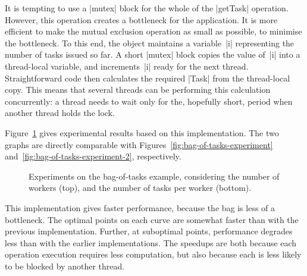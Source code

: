 
It is tempting to use a |mutex| block for the whole of the |getTask|
operation.  However, this operation creates a bottleneck for the application.
It is more efficient to make the mutual exclusion operation as small as
possible, to minimise the bottleneck.  To this end, the object maintains a
variable~|i| representing the number of tasks issued so far.  A short |mutex|
block copies the value of~|i| into a thread-local variable, and increments~|i|
ready for the next thread.  Straightforward code then calculates the required
|Task| from the thread-local copy.  This means that several threads can be
performing this calculation concurrently: a thread needs to wait only for the,
hopefully short, period when another thread holds the lock.


Figure~\ref{fig:bag-of-tasks-experiment-monitors}
gives experimental results based on this implementation.  The two graphs are
directly comparable with Figures~\ref{fig:bag-of-tasks-experiment}
and~\ref{fig:bag-of-tasks-experiment-2}, respectively.

\begin{figure}
\begin{center}


\bigskip


\end{center}
\caption{Experiments on the bag-of-tasks example, considering the number of
  workers (top), and the number of tasks per worker (bottom).}
\label{fig:bag-of-tasks-experiment-monitors}
\end{figure}


This implementation gives faster performance, because the bag is less of a
bottleneck.  The optimal points on each curve are somewhat faster than with
the previous implementation.  Further, at suboptimal points, performance
degrades less than with the earlier implementations.  The speedups are both
because each operation execution requires less computation, but also because 
each is less likely to be blocked by another thread.  


